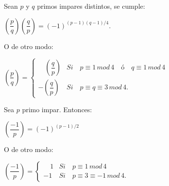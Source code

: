 \begin{theorem}
	Sean $p$ y $q$ primos impares distintos, se cumple:
	
	\begin{center}
		$
	\left( \dfrac{p}{q} \right) 	\left( \dfrac{q}{p} \right) = \left( -1 \right) ^{(p-1)(q-1)/4}
	$.
	\end{center}
	O de otro modo:
	
	\begin{center}
		$
		\left({\dfrac p q}\right) = \begin{cases}
		\quad \left({\dfrac q p}\right) & Si\quad p \equiv 1 \, mod \, 4 \quad  ó \quad  q \equiv 1 \, mod \, 4 \\
		-\left({\dfrac q p}\right) & Si\quad p \equiv q \equiv 3 \, mod \, 4.
		\end{cases}
		$
	\end{center}
	
	\label{quadRec:theo}
	
	
\end{theorem}



\begin{proposition}
	Sea $p$ primo impar. Entonces:
	
	\begin{center}
		$
			\left( \dfrac{-1}{p}\right) = (-1)^{(p-1)/2}
		$
	\end{center}
	
	
	O de otro modo:
	
	\begin{center}
		$
		\left(\dfrac{-1}{p}\right) = \begin{cases}
		\quad 1 & Si\quad p \equiv 1 \, mod \, 4 \\
		-1 & Si\quad p \equiv 3 \equiv -1 \, mod \, 4.
		\end{cases}
		$
	\end{center}
	
\end{proposition}

